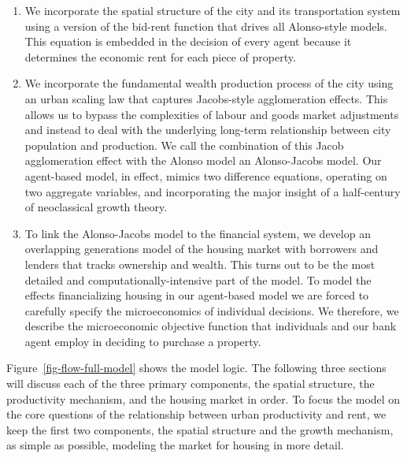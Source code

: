 \begin{enumerate}
\item We incorporate the spatial structure of the city and its transportation system using a version of the \gls{bid-rent function} that drives all Alonso-style models. This equation is embedded in the decision of every agent because it determines the economic rent for each piece of property.

\item We incorporate the fundamental wealth production process of the city using an \gls{urban scaling} law that captures Jacobs-style agglomeration effects. This allows us to bypass the complexities of labour and goods market adjustments and instead to deal with the underlying long-term relationship between city population and production. We call the combination of this Jacob agglomeration effect with the Alonso model an \gls{Alonso-Jacobs model}. Our \gls{agent-based model}, in effect, mimics two difference equations, operating on two aggregate variables, and incorporating the major insight of a half-century of \gls{neoclassical growth theory}.

\item To link the Alonso-Jacobs model to the financial system, we develop an \gls{overlapping generations} model of the housing market with borrowers and lenders that tracks ownership and wealth. This turns out to be the most detailed and computationally-intensive part of the model. To model the effects financializing housing in our \gls{agent-based model} we are forced to carefully specify the microeconomics of individual decisions. %
We therefore, we describe the microeconomic objective function that individuals and our bank agent employ in deciding to purchase a property. 
\end{enumerate}

Figure~\ref{fig-flow-full-model} shows the model logic.  The following three sections will discuss each of the three primary components, the spatial structure, the productivity mechanism, and the housing market in order.  To focus the model on the core questions of the relationship between urban productivity and rent, we keep the first two components,  the spatial structure and the growth mechanism,  as simple as possible, modeling the market for housing in more detail. 


